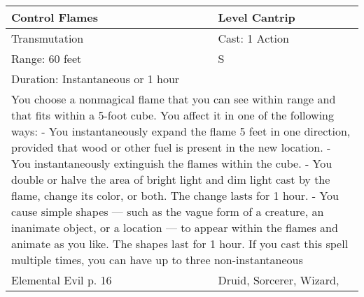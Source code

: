 \documentclass[11pt]{report}
\begin{document}
\begin{table}[H]
	\begin{tabular}{||p{6cm}|p{6cm}||}
		\hline\hline
		\bf{Control Flames} & Level Cantrip\\ \hline
		Transmutation & Cast: 1 Action\\ \hline
		Range: 60 feet & S\\ \hline
		Duration: Instantaneous or 1 hour & \\ \hline
		\multicolumn{2}{||p{12cm}||}{You choose a nonmagical flame that you can see within range and that fits within a 5-foot cube. You affect it in one of the following ways:
- You instantaneously expand the flame 5 feet in one direction, provided that wood or other fuel is present in the new location.
- You instantaneously extinguish the flames within the cube.
- You double or halve the area of bright light and dim light cast by the flame, change its color, or both. The change lasts for 1 hour.
- You cause simple shapes — such as the vague form of a creature, an inanimate object, or a location — to appear within the flames and animate as you like. The shapes last for 1 hour.
If you cast this spell multiple times, you can have up to three non-instantaneous}\\ \hline
Elemental Evil p. 16 & Druid, Sorcerer, Wizard, \\ \hline\hline
	\end{tabular}
\end{table}
\end{document}
